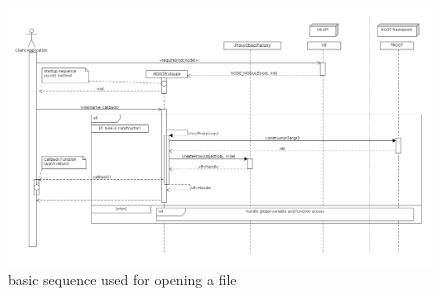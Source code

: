 \begin{figure}[htb]
	\centering
	\includegraphics[width=18cm]{./latex/resources/fileOpen.png}
	\caption{basic sequence used for opening a file}
\end{figure}
